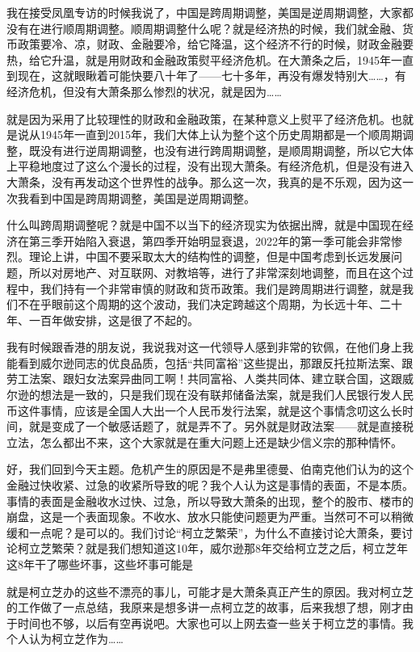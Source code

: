 \documentclass[UTF8, 12pt, a4paper]{ctexrep}
\begin{document}
我在接受凤凰专访的时候我说了，中国是跨周期调整，美国是逆周期调整，大家都没有在进行顺周期调整。顺周期调整什么呢？就是经济热的时候，我们就金融、货币政策要冷、凉，财政、金融要冷，给它降温，这个经济不行的时候，财政金融要热，给它升温，就是用财政和金融政策熨平经济危机。在大萧条之后，1945年一直到现在，这就眼瞅着可能快要八十年了——七十多年，再没有爆发特别大……，有经济危机，但没有大萧条那么惨烈的状况，就是因为……

就是因为采用了比较理性的财政和金融政策，在某种意义上熨平了经济危机。也就是说从1945年一直到2015年，我们大体上认为整个这个历史周期都是一个顺周期调整，既没有进行逆周期调整，也没有进行跨周期调整，是顺周期调整，所以它大体上平稳地度过了这么个漫长的过程，没有出现大萧条。有经济危机，但是没有进入大萧条，没有再发动这个世界性的战争。那么这一次，我真的是不乐观，因为这一次我看到中国是跨周期调整，美国是逆周期调整。

什么叫跨周期调整呢？就是中国不以当下的经济现实为依据出牌，就是中国现在经济在第三季开始陷入衰退，第四季开始明显衰退，2022年的第一季可能会非常惨烈。理论上讲，中国不要采取太大的结构性的调整，但是中国考虑到长远发展问题，所以对房地产、对互联网、对教培等，进行了非常深刻地调整，而且在这个过程中，我们持有一个非常审慎的财政和货币政策。我们是跨周期进行调整，就是我们不在乎眼前这个周期的这个波动，我们决定跨越这个周期，为长远十年、二十年、一百年做安排，这是很了不起的。

我有时候跟香港的朋友说，我说我对这一代领导人感到非常的钦佩，在他们身上我能看到威尔逊同志的优良品质，包括“共同富裕”这些提出，那跟反托拉斯法案、跟劳工法案、跟妇女法案异曲同工啊！共同富裕、人类共同体、建立联合国，这跟威尔逊的想法是一致的，只是我们现在没有联邦储备法案，就是我们人民银行发人民币这件事情，应该是全国人大出一个人民币发行法案，就是这个事情念叨这么长时间，就是变成了一个敏感话题了，就是弄不了。另外就是财政法案——就是直接税立法，怎么都出不来，这个大家就是在重大问题上还是缺少信义宗的那种情怀。

好，我们回到今天主题。危机产生的原因是不是弗里德曼、伯南克他们认为的这个金融过快收紧、过急的收紧所导致的呢？我个人认为这是事情的表面，不是本质。事情的表面是金融收水过快、过急，所以导致大萧条的出现，整个的股市、楼市的崩盘，这是一个表面现象。不收水、放水只能使问题更为严重。当然可不可以稍微缓和一点呢？是可以的。我们讨论“柯立芝繁荣”，为什么不直接讨论大萧条，要讨论柯立芝繁荣？就是我们想知道这10年，威尔逊那8年交给柯立芝之后，柯立芝年这8年干了哪些坏事，这些坏事可能是

就是柯立芝办的这些不漂亮的事儿，可能才是大萧条真正产生的原因。我对柯立芝的工作做了一点总结，我原来是想多讲一点柯立芝的故事，后来我想了想，刚才由于时间也不够，以后有空再说吧。大家也可以上网去查一些关于柯立芝的事情。我个人认为柯立芝作为……
\end{document}

